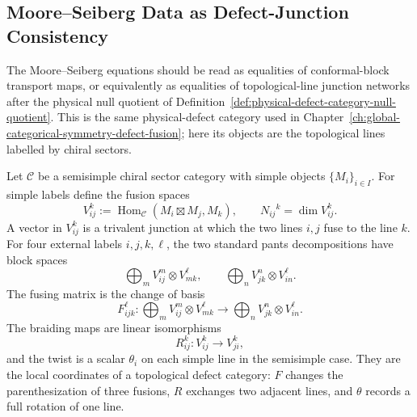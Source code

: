 \subsection{Moore--Seiberg Data as Defect-Junction Consistency}
\label{subsec:moore-seiberg-defect-junction-consistency}

The Moore--Seiberg equations should be read as equalities of conformal-block
transport maps, or equivalently as equalities of topological-line junction
networks after the physical null quotient of
Definition~\ref{def:physical-defect-category-null-quotient}.  This is the
same physical-defect category used in
Chapter~\ref{ch:global-categorical-symmetry-defect-fusion}; here its objects
are the topological lines labelled by chiral sectors.

Let \(\mathcal C\) be a semisimple chiral sector category with simple objects
\(\{M_i\}_{i\in I}\).  For simple labels define the fusion spaces
\begin{equation}
  V_{ij}^{k}:=\operatorname{Hom}_{\mathcal C}(M_i\boxtimes M_j,M_k),
  \qquad
  N_{ij}{}^k=\dim V_{ij}^k .
  \label{eq:moore-seiberg-fusion-spaces}
\end{equation}
A vector in \(V_{ij}^{k}\) is a trivalent junction at which the two lines
\(i,j\) fuse to the line \(k\).  For four external labels \(i,j,k,\ell\),
the two standard pants decompositions have block spaces
\begin{equation}
  \bigoplus_m V_{ij}^{m}\otimes V_{m k}^{\ell},
  \qquad
  \bigoplus_n V_{jk}^{n}\otimes V_{i n}^{\ell}.
  \label{eq:moore-seiberg-two-four-point-bases}
\end{equation}
The fusing matrix is the change of basis
\begin{equation}
  F_{ijk}^{\ell}:
  \bigoplus_m V_{ij}^{m}\otimes V_{m k}^{\ell}
  \longrightarrow
  \bigoplus_n V_{jk}^{n}\otimes V_{i n}^{\ell}.
  \label{eq:moore-seiberg-f-move}
\end{equation}
The braiding maps are linear isomorphisms
\begin{equation}
  R_{ij}^{k}:V_{ij}^{k}\longrightarrow V_{ji}^{k},
  \label{eq:moore-seiberg-r-move}
\end{equation}
and the twist is a scalar \(\theta_i\) on each simple line in the semisimple
case.  They are the local coordinates of a topological defect category:
\(F\) changes the parenthesization of three fusions, \(R\) exchanges two
adjacent lines, and
\(\theta\) records a full rotation of one line.

